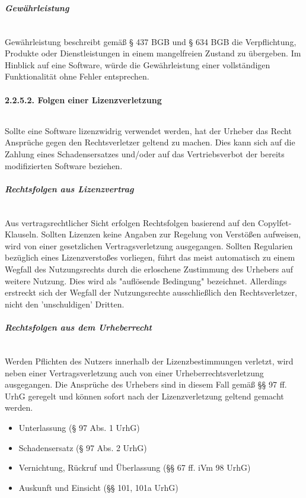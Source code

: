 \subparagraph{Gewährleistung}$~$

Gewährleistung beschreibt gemäß § 437 BGB und § 634 BGB die Verpflichtung, Produkte oder Dienstleistungen in einem mangelfreien Zustand zu übergeben. Im Hinblick auf eine Software, würde die Gewährleistung einer vollständigen Funktionalität ohne Fehler entsprechen. 

\paragraph{2.2.5.2. Folgen einer Lizenzverletzung}$~$

Sollte eine Software lizenzwidrig verwendet werden, hat der Urheber das Recht Ansprüche gegen den Rechtsverletzer geltend zu machen. Dies kann sich auf die Zahlung eines Schadensersatzes und/oder auf das Vertriebsverbot der bereits modifizierten Software beziehen.

\subparagraph{Rechtsfolgen aus Lizenzvertrag}$~$

Aus vertragsrechtlicher Sicht erfolgen Rechtsfolgen basierend auf den Copylfet-Klauseln. Sollten Lizenzen keine Angaben zur Regelung von Verstößen aufweisen, wird von einer gesetzlichen Vertragsverletzung ausgegangen. Sollten Regularien bezüglich eines Lizenzverstoßes vorliegen, führt das meist automatisch zu einem Wegfall des Nutzungsrechts durch die erloschene Zustimmung des Urhebers auf weitere Nutzung. Dies wird als "auflösende Bedingung" bezeichnet.\cite[S. 68]{bitkom_open_2016}  Allerdings erstreckt sich der Wegfall der Nutzungsrechte ausschließlich den Rechtsverletzer, nicht den 'unschuldigen' Dritten.

\subparagraph{Rechtsfolgen aus dem Urheberrecht}$~$

Werden Pflichten des Nutzers innerhalb der Lizenzbestimmungen verletzt, wird neben einer Vertragsverletzung auch von einer Urheberrechtsverletzung ausgegangen. Die Ansprüche des Urhebers sind in diesem Fall gemäß §§ 97 ff. UrhG geregelt und können sofort nach der Lizenzverletzung geltend gemacht werden. 

\begin{itemize}
    \item Unterlassung (§ 97 Abs. 1 UrhG)
    \item Schadensersatz (§ 97 Abs. 2 UrhG)
    \item Vernichtung, Rückruf und Überlassung (§§ 67 ff. iVm 98 UrhG)
    \item Auskunft und Einsicht (§§ 101, 101a UrhG)
\end{itemize}

